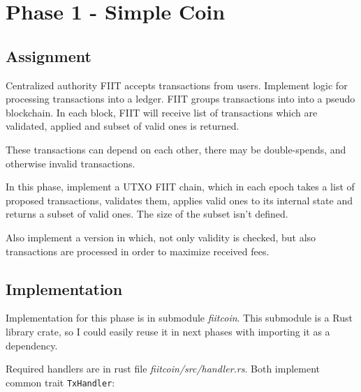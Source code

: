 \section{Phase 1 - Simple Coin}

\subsection{Assignment}

Centralized authority FIIT accepts transactions from users. Implement logic
for processing transactions into a ledger. FIIT groups transactions into 
into a pseudo blockchain. In each block, FIIT will receive list of transactions
which are validated, applied and subset of valid ones is returned.

These transactions can depend on each other, there may be double-spends, and
otherwise invalid transactions.

In this phase, implement a UTXO FIIT chain, which in each epoch takes a list
of proposed transactions, validates them, applies valid ones to its internal
state and returns a subset of valid ones. The size of the subset isn't defined.

Also implement a version in which, not only validity is checked, but also transactions
are processed in order to maximize received fees.

\subsection{Implementation}

Implementation for this phase is in submodule \emph{fiitcoin}. This submodule
is a Rust library crate, so I could easily reuse it in next phases with importing
it as a dependency.

Required handlers are in rust file \emph{fiitcoin/src/handler.rs}. Both implement
common trait \texttt{TxHandler}:

